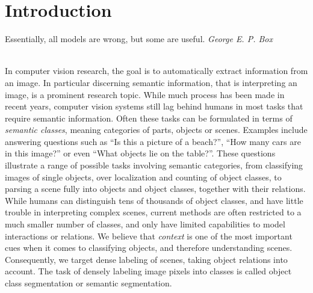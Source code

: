 \chapter{Introduction}
\vspace{1cm}
\hfill%
\begin{minipage}{.4\linewidth}
Essentially, all models are wrong, but some are useful. 
\flushright%
\emph{George E. P. Box}

\end{minipage}%
\\[2cm]
In computer vision research, the goal is to automatically extract information from an image.
In particular discerning semantic information, that is interpreting an image, is a prominent
research topic.
While much process has been made in recent years, computer vision systems still lag behind
humans in most tasks that require semantic information. Often these tasks can be formulated
in terms of \emph{semantic classes}, meaning categories of parts, objects or scenes.
Examples include answering questions such as ``Is this a picture of a beach?'', ``How many
cars are in this image?'' or even ``What objects lie on the table?''.
These questions illustrate a range of possible tasks involving semantic categories,
from classifying images of single objects, over localization and counting of object classes,
to parsing a scene fully into objects and object classes, together with their relations.
%
While humans can distinguish tens of thousands of object classes, and have little trouble
in interpreting complex scenes, current methods are often restricted to a much smaller number
of classes, and only have limited capabilities to model interactions or relations.
We believe that \emph{context} is one of the most important cues when it comes to classifying objects,
and therefore understanding scenes. Consequently, we target dense labeling of scenes, taking
object relations into account.
The task of densely labeling image pixels into classes is called object class segmentation
or semantic segmentation.
\pagebreak

